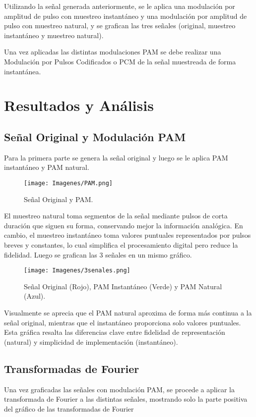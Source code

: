 \documentclass[letter,12pt]{article}
\begin{document}
Utilizando la señal generada anteriormente, se le aplica una modulación por amplitud de pulso con muestreo instantáneo y una modulación por amplitud de pulso con muestreo natural, y se grafican las tres señales (original, muestreo instantáneo y muestreo natural).

Una vez aplicadas las distintas modulaciones PAM se debe realizar una Modulación por Pulsos Codificados o PCM de la señal muestreada de forma instantánea.
\clearpage
\section{Resultados y Análisis}

\subsection{Señal Original y Modulación PAM}
Para la primera parte se genera la señal original y luego se le aplica PAM instantáneo y PAM natural.

\begin{figure}[H]
        \centering
        \texttt{[image: Imagenes/PAM.png]}
        \label{fig:a1}
        \caption{Señal Original y PAM.}
\end{figure}

El muestreo natural toma segmentos de la señal mediante pulsos de corta duración que siguen su forma, conservando mejor la información analógica. En cambio, el muestreo instantáneo toma valores puntuales representados por pulsos breves y constantes, lo cual simplifica el procesamiento digital pero reduce la fidelidad. Luego se grafican las 3 señales en un mismo gráfico.

\begin{figure}[H]
        \centering
        \texttt{[image: Imagenes/3senales.png]}
        \label{fig:a1}
        \caption{Señal Original (Rojo), PAM Instantáneo (Verde) y PAM Natural (Azul).}
\end{figure}

Visualmente se aprecia que el PAM natural aproxima de forma más continua a la señal original, mientras que el instantáneo proporciona solo valores puntuales. Esta gráfica resalta las diferencias clave entre fidelidad de representación (natural) y simplicidad de implementación (instantáneo).

\subsection{Transformadas de Fourier}
Una vez graficadas las señales con modulación PAM, se procede a aplicar la transformada de Fourier a las distintas señales, mostrando solo la parte positiva del gráfico de las transformadas de Fourier
\end{document}
